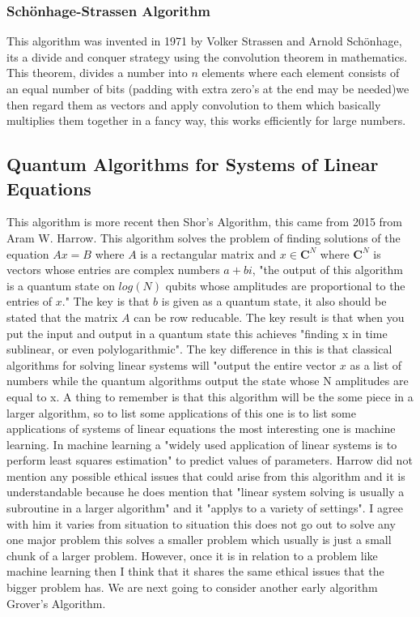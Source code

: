 \documentclass{article}
\begin{document}
\subsubsection{Schönhage-Strassen Algorithm}
This algorithm was invented in 1971 by Volker Strassen and Arnold Schönhage, its a divide and conquer strategy using the convolution theorem in mathematics. This theorem, divides a number into $n$ elements where each element consists of an equal number of bits (padding with extra zero's at the end may be needed)we then regard them as vectors and apply convolution to them which basically multiplies them together in a fancy way, this works efficiently for large numbers.   
\subsection{Quantum Algorithms for Systems of Linear Equations}  

This algorithm is more recent then Shor's Algorithm, this came from 2015 from Aram W. Harrow. This algorithm solves the problem of finding solutions of the equation $Ax = B$ where $A$ is a rectangular matrix and $x \in \mathbf{C}^{N}$ where $\mathbf{C}^{N}$ is vectors whose entries are complex numbers $a + bi$, "the output of this algorithm is a quantum state on $log(N)$ qubits whose amplitudes are proportional to the entries of $x$."\cite{Harrow2015} The key is that $b$ is given as a quantum state, it also should be stated that the matrix $A$ can be row reducable. The key result is that when you put the input and output in a quantum state this achieves "finding x in time sublinear, or even polylogarithmic".\cite{Harrow2015} The key difference in this is that classical algorithms for solving linear systems will "output the entire vector $x$ as a list of numbers while the quantum algorithms output the state whose N amplitudes are equal to x. A thing to remember is that this algorithm will be the some piece in a larger algorithm, so to list some applications of this one is to list some applications of systems of linear equations the most interesting one is machine learning. In machine learning a "widely used application of linear systems is to perform least squares estimation"\cite{Harrow2015} to predict values of parameters. Harrow did not mention any possible ethical issues that could arise from this algorithm and it is understandable because he does mention that "linear system solving is usually a subroutine in a larger algorithm" and it "applys to a variety of settings".\cite{Harrow2015} I agree with him it varies from situation to situation this does not go out to solve any one major problem this solves a smaller problem which usually is just a small chunk of a larger problem. However, once it is in relation to a problem like machine learning then I think that it shares the same ethical issues that the bigger problem has. We are next going to consider another early algorithm Grover's Algorithm.
\end{document}
